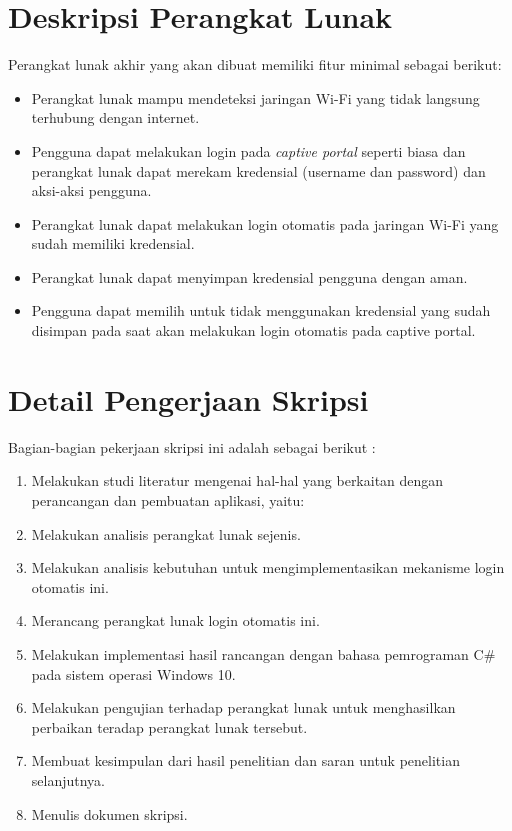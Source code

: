 \documentclass[a4paper,twoside]{article}
\begin{document}
\section{Deskripsi Perangkat Lunak}

Perangkat lunak akhir yang akan dibuat memiliki fitur minimal sebagai berikut:
\begin{itemize}
	\item Perangkat lunak mampu mendeteksi jaringan Wi-Fi yang tidak langsung terhubung dengan internet.
	\item Pengguna dapat melakukan login pada \textit{captive portal} seperti biasa dan perangkat lunak dapat merekam kredensial (username dan password) dan aksi-aksi pengguna.
	\item Perangkat lunak dapat melakukan login otomatis pada jaringan Wi-Fi yang sudah memiliki kredensial.
	\item Perangkat lunak dapat menyimpan kredensial pengguna dengan aman.
	\item Pengguna dapat memilih untuk tidak menggunakan kredensial yang sudah disimpan pada saat akan melakukan login otomatis pada captive portal.
		
\end{itemize}

\section{Detail Pengerjaan Skripsi}

Bagian-bagian pekerjaan skripsi ini adalah sebagai berikut :
	\begin{enumerate}
        \item{Melakukan studi literatur mengenai hal-hal yang berkaitan dengan perancangan dan pembuatan aplikasi, yaitu:}
        \item{Melakukan analisis perangkat lunak sejenis.}
        \item{Melakukan analisis kebutuhan untuk mengimplementasikan mekanisme login otomatis ini.}
        \item{Merancang perangkat lunak login otomatis ini.}
        \item{Melakukan implementasi hasil rancangan dengan bahasa pemrograman C\# pada sistem operasi Windows 10.}
        \item{Melakukan pengujian terhadap perangkat lunak untuk menghasilkan perbaikan teradap perangkat lunak tersebut.}
        \item{Membuat kesimpulan dari hasil penelitian dan saran untuk penelitian selanjutnya.}
        \item{Menulis dokumen skripsi.}
    \end{enumerate}
\end{document}
